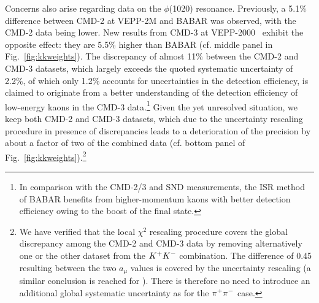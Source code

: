Concerns also arise regarding data on the $\phi$(1020) resonance. Previously, a 5.1\% difference between CMD-2 at VEPP-2M and BABAR was observed, with the CMD-2 data being lower. New results from CMD-3 at VEPP-2000~\cite{Kozyrev:2017agm} exhibit the opposite effect: they are 5.5\% higher than BABAR (cf. middle panel in Fig.~\ref{fig:kkweights}). The  discrepancy of almost 11\% between the  CMD-2 and CMD-3 datasets, which largely exceeds the  quoted systematic uncertainty of 2.2\%, of which only 1.2\% accounts for uncertainties in the detection efficiency, is claimed to originate from a better understanding of the detection efficiency of low-energy kaons in the CMD-3 data.\footnote{In comparison with the CMD-2/3 and SND measurements, the ISR method of BABAR benefits from higher-momentum kaons with better detection efficiency owing to the boost of the final state.}
Given the  yet unresolved situation, we keep both CMD-2 and CMD-3 datasets, which due to the uncertainty rescaling procedure in presence of discrepancies leads to a deterioration of the precision by about a factor of two of the combined data (cf. bottom panel of Fig.~\ref{fig:kkweights}).\footnote{We have verified that the local $\chi^2$ rescaling procedure covers the global discrepancy among the CMD-2 and CMD-3 data by removing alternatively one or the other dataset from the $K^+K^-$ combination. The difference of 0.45 resulting between the two $a_\mu$ values is covered by the uncertainty rescaling (a similar conclusion is reached for \dahadZ). There is therefore no need to introduce an additional global systematic uncertainty as for the $\pi^+\pi^-$ case.}
